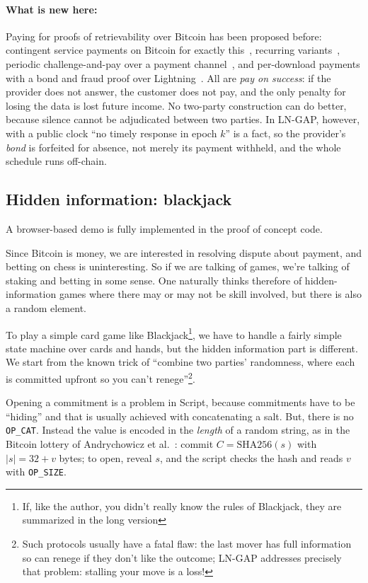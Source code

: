 \documentclass[11pt]{article}
\newcommand{\op}[1]{\texttt{OP\_#1}}
\begin{document}
\paragraph{What is new here:} Paying for proofs of retrievability over
Bitcoin has been proposed before: contingent service payments on
Bitcoin for exactly this~\cite{zkcsp}, recurring variants~\cite{rcpor},
periodic challenge-and-pay over a payment channel~\cite{scrypt}, and
per-download payments with a bond and fraud proof over
Lightning~\cite{bitstream}. All are \emph{pay on success}: if the
provider does not answer, the customer does not pay, and the only
penalty for losing the data is lost future income. No two-party
construction can do better, because silence cannot be adjudicated
between two parties. In LN-GAP, however, with a public clock ``no timely response in epoch
$k$'' is a fact, so the provider's \emph{bond} is forfeited for absence,
not merely its payment withheld, and the whole schedule runs off-chain.

\subsection{Hidden information: blackjack}
\label{sec:blackjack}

A browser-based demo is fully implemented in the proof of concept code.

Since Bitcoin is money, we are interested in resolving dispute about payment, and betting on chess is uninteresting. So if we are talking of games, we're talking of staking and betting in some sense. One naturally thinks therefore of hidden-information games where there may or may not be skill involved, but there is also a random element.

To play a simple card game like Blackjack\footnote{If, like the author, you didn't really know the rules of Blackjack, they are summarized in the long version}, we have to handle a fairly simple state machine over cards and hands, but the hidden information part is different. We start from the known trick of ``combine two parties' randomness, where each is committed upfront so you can't renege''\footnote{Such protocols usually have a fatal flaw: the last mover has full information so can renege if they don't like the outcome; LN-GAP addresses precisely that problem: stalling your move is a loss!}.

Opening a commitment is a problem in Script, because commitments have to be ``hiding'' and that is usually achieved with concatenating a salt. But, there is no \op{CAT}. Instead the value is
encoded in the \emph{length} of a random string, as in the Bitcoin
lottery of Andrychowicz et al.~\cite{smcbitcoin}: commit
$C = \mathrm{SHA256}(s)$ with $|s| = 32 + v$ bytes; to open, reveal $s$,
and the script checks the hash and reads $v$ with \op{SIZE}.
\end{document}
